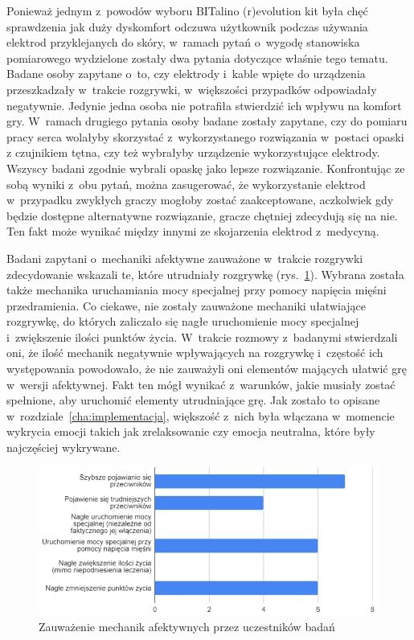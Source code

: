 Ponieważ jednym z~powodów wyboru BITalino (r)evolution kit była chęć sprawdzenia jak duży dyskomfort odczuwa użytkownik podczas używania elektrod przyklejanych do skóry, w~ramach pytań o~wygodę stanowiska pomiarowego wydzielone zostały dwa pytania dotyczące właśnie tego tematu. Badane osoby zapytane o~to, czy elektrody i~kable wpięte do urządzenia przeszkadzały w~trakcie rozgrywki, w~większości przypadków odpowiadały negatywnie. Jedynie jedna osoba nie potrafiła stwierdzić ich wpływu na komfort gry. W~ramach drugiego pytania osoby badane zostały zapytane, czy do pomiaru pracy serca wolałyby skorzystać z~wykorzystanego rozwiązania w~postaci opaski z czujnikiem tętna, czy też wybrałyby urządzenie wykorzystujące elektrody. Wszyscy badani zgodnie wybrali opaskę jako lepsze rozwiązanie. Konfrontując ze sobą wyniki z~obu pytań, można zasugerować, że wykorzystanie elektrod w~przypadku zwykłych graczy mogłoby zostać zaakceptowane, aczkolwiek gdy będzie dostępne alternatywne rozwiązanie, gracze chętniej zdecydują się na nie. Ten fakt może wynikać między innymi ze skojarzenia elektrod z~medycyną.

Badani zapytani o~mechaniki afektywne zauważone w~trakcie rozgrywki zdecydowanie wskazali te, które utrudniały rozgrywkę (rys.~\ref{fig:seen_mechanics}). Wybrana została także mechanika uruchamiania mocy specjalnej przy pomocy napięcia mięśni przedramienia. Co ciekawe, nie zostały zauważone mechaniki ułatwiające rozgrywkę, do których zaliczało się nagłe uruchomienie mocy specjalnej i~zwiększenie ilości punktów życia. W~trakcie rozmowy z~badanymi stwierdzali oni, że ilość mechanik negatywnie wpływających na rozgrywkę i~częstość ich występowania powodowało, że nie zauważyli oni elementów mających ułatwić grę w~wersji afektywnej. Fakt ten mógł wynikać z~warunków, jakie musiały zostać spełnione, aby uruchomić elementy utrudniające grę. Jak zostało to opisane w~rozdziale~\ref{cha:implementacja}, większość z~nich była włączana w~momencie wykrycia emocji takich jak zrelaksowanie czy emocja neutralna, które były najczęściej wykrywane.
\begin{figure}
	\centering
	\includegraphics[width=0.8\linewidth]{images/affective_mechanics_seen.png}
	\caption{Zauważenie mechanik afektywnych przez uczestników badań}
	\label{fig:seen_mechanics}
\end{figure}

